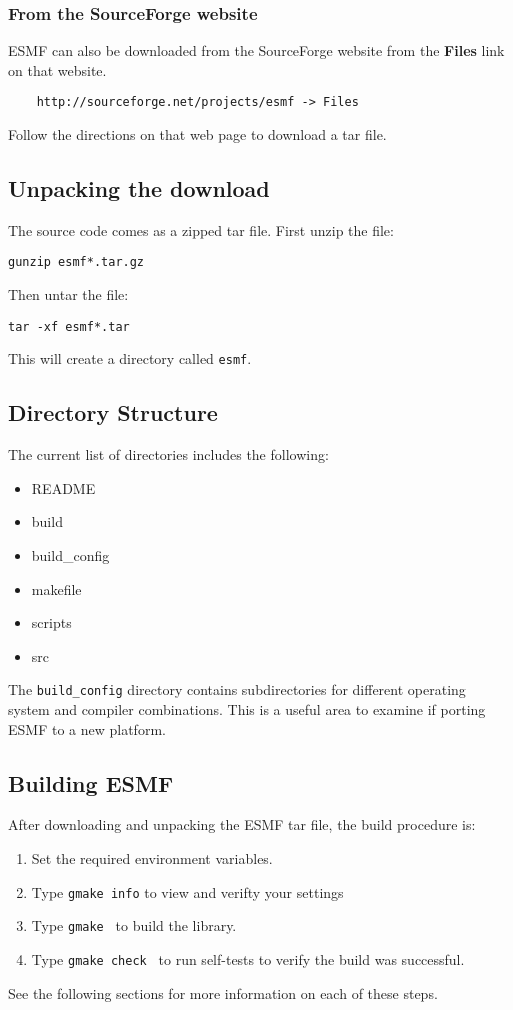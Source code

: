\subsubsection{From the SourceForge website}
ESMF can also be downloaded from the SourceForge website
from the {\bf Files} link on that website.
\begin{verbatim}
    http://sourceforge.net/projects/esmf -> Files
\end{verbatim}
Follow the directions on that web page to download a tar file.  

\subsection{Unpacking the download}
The source code comes as a zipped tar file. First unzip the file:
\begin{verbatim}
gunzip esmf*.tar.gz
\end{verbatim}

Then untar the file:
\begin{verbatim}
tar -xf esmf*.tar
\end{verbatim}

This will create a directory called {\tt esmf}.

\subsection{Directory Structure}
The current list of directories includes the following:
\begin{itemize}
\item README
\item build
\item build\_config
\item makefile
\item scripts
\item src
\end{itemize}

The {\tt build\_config} directory contains subdirectories for
different operating system and compiler combinations. This is
a useful area to examine if porting ESMF to a new platform.

\subsection{Building ESMF}

After downloading and unpacking the ESMF tar file, the build procedure is:
\begin{enumerate}
\item Set the required environment variables. 
\item Type {\tt gmake info} to view and verifty your settings
\item Type {\tt gmake } to build the library.
\item Type {\tt gmake check } to run self-tests to verify
the build was successful.
\end{enumerate}
See the following sections for more information on each of these steps.

